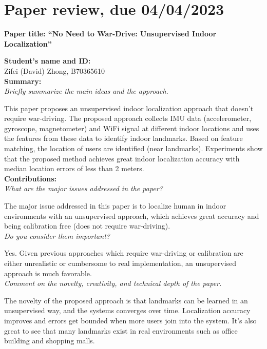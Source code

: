 \documentclass[11pt, oneside]{article}   	%
\begin{document}
\newpage
\section{Paper review, due 04/04/2023}
\begin{center}
\noindent
\textbf{\Large Paper title: ``No Need to War-Drive: Unsupervised Indoor Localization''}
\end{center}


\noindent \textbf{Student's name and ID: }\\
Zifei (David) Zhong, B70365610\\

\noindent \textbf{Summary:}\\
\emph{Briefly summarize the main ideas and the approach}.

This paper proposes an unsupervised indoor localization approach that doesn't require war-driving. The proposed approach collects IMU data (accelerometer, gyroscope, magnetometer) and WiFi signal at different indoor locations and uses the features from these data to identify indoor landmarks. Based on feature matching, the location of users are identified (near landmarks). Experiments show that the proposed method achieves great indoor localization accuracy with median location errors of less than 2 meters.\\

\noindent \textbf{Contributions:}\\
\emph{What are the major issues addressed in the paper?}

The major issue addressed in this paper is to localize human in indoor environments with an unsupervised approach, which achieves great accuracy and being calibration free (does not require war-driving). \\


\noindent \emph{Do you consider them important?}

Yes. Given previous approaches which require war-driving or calibration are either unrealistic or cumbersome  to real implementation, an unsupervised approach is much favorable. \\


\noindent \emph{Comment on the novelty, creativity, and technical depth of the paper.}

The novelty of the proposed approach is that landmarks can be learned in an unsupervised way, and the systems converges over time. Localization accuracy improves and errors get bounded when more users join into the system. It's also great to see that many landmarks exist in real environments such as office building and shopping malls. 
\end{document}
